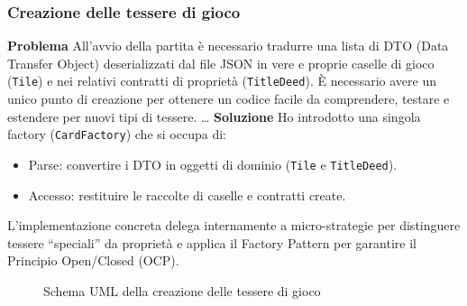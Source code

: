 \subsubsection{Creazione delle tessere di gioco}
\textbf{Problema}\newline
All'avvio della partita è necessario tradurre una lista di DTO (Data Transfer Object) 
deserializzati dal file JSON in vere e proprie caselle di gioco (\texttt{Tile}) e nei relativi contratti di proprietà (\texttt{TitleDeed}).\newline
È necessario avere un unico punto di creazione per ottenere un codice facile da comprendere, testare e estendere per nuovi tipi di tessere.
\dots\newline
\textbf{Soluzione}\newline
Ho introdotto una singola factory (\texttt{CardFactory}) che si occupa di:\newline
\begin{itemize}
  \item Parse: convertire i DTO in oggetti di dominio (\texttt{Tile} e \texttt{TitleDeed}).
  \item Accesso: restituire le raccolte di caselle e contratti create.
\end{itemize}
L'implementazione concreta delega internamente a micro-strategie per distinguere tessere “speciali” da proprietà 
e applica il Factory Pattern per garantire il Principio Open/Closed (OCP).
\newline
\begin{figure}[H]
    \centering
    \caption{Schema UML della creazione delle tessere di gioco}
	\label{img:CardFactory}
\end{figure}

